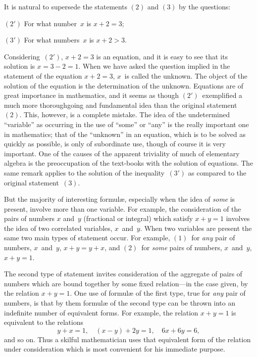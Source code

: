 \documentclass[12pt,leqno]{book}[2005/09/16]
\newcommand{\PageSep}[1]{\ignorespaces}
\newcommand{\Eq}[1]{\ensuremath{#1}}
\begin{document}
It is natural to supersede the statements
\Eq{(2)} and \Eq{(3)} by the questions:

\Eq{(2')} For what number~$x$ is $x + 2 = 3$;

\Eq{(3')} For what numbers~$x$ is $x + 2 > 3$.

Considering~\Eq{(2')}, $x + 2 = 3$ is an equation, and
%
it is easy to see that its solution is $x = 3 - 2 = 1$.
When we have asked the question implied in
the statement of the equation $x + 2 = 3$, $x$~is
called the unknown. The object of the solution
of the equation is the determination of
the unknown. Equations are of great importance
in mathematics, and it seems as
though \Eq{(2')}~exemplified a much more thoroughgoing
and fundamental idea than the original
statement~\Eq{(2)}. This, however, is a complete
mistake. The idea of the undetermined
\PageSep{18}
``variable'' as occurring in the use of ``some''
or ``any'' is the really important one in
mathematics; that of the ``unknown'' in an
equation, which is to be solved as quickly as
possible, is only of subordinate use, though
of course it is very important. One of the
causes of the apparent triviality of much of
elementary algebra is the preoccupation of
the text-books with the solution of equations.
The same remark applies to the solution of
the inequality~\Eq{(3')} as compared to the original
statement~\Eq{(3)}.

But the majority of interesting formulæ,
%
%
especially when the idea of \emph{some} is present,
involve more than one variable. For example,
the consideration of the pairs of numbers
$x$ and~$y$ (fractional or integral) which
satisfy $x + y = 1$ involves the idea of two correlated
variables, $x$~and~$y$. When two variables
are present the same two main types of
statement occur. For example, \Eq{(1)}~for
\emph{any} pair of numbers, $x$~and~$y$, $x + y = y + x$,
and \Eq{(2)}~for \emph{some} pairs of numbers, $x$~and~$y$,
$x + y = 1$.

The second type of statement invites consideration
of the aggregate of pairs of numbers
which are bound together by some fixed
relation---in the case given, by the relation
$x + y = 1$. One use of formulæ of the first
type, true for \emph{any} pair of numbers, is that by
them formulæ of the second type can be
\PageSep{19}
thrown into an indefinite number of equivalent
forms. For example, the relation $x + y = 1$
is equivalent to the relations
\[
y + x = 1,\quad
(x - y) + 2y = 1,\quad
6x + 6y = 6,
\]
and so on. Thus a skilful mathematician
uses that equivalent form of the relation
under consideration which is most convenient
for his immediate purpose.
\end{document}
